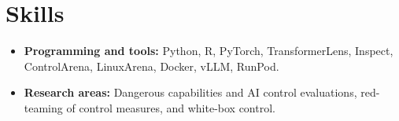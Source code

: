 \documentclass[10pt,a4paper]{article}
\begin{document}
\section*{Skills}
\begin{itemize}
  \item \textbf{Programming and tools:} Python, R, PyTorch, TransformerLens, Inspect, ControlArena, LinuxArena, Docker, vLLM, RunPod.
  \item \textbf{Research areas:} Dangerous capabilities and AI control evaluations, red-teaming of control measures, and white-box control.
\end{itemize}
\end{document}
